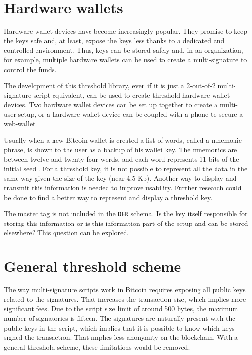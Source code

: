 \section{Hardware wallets}

Hardware wallet devices have become increasingly popular. They promise to keep
the keys safe and, at least, expose the keys less
thanks to a dedicated and controlled environment. Thus, keys can be stored
safely and, in an organization, for example, multiple hardware wallets can be
used to create a multi-signature to control the funds.

The development of this threshold library, even if it is just a 2-out-of-2
multi-signature script equivalent, can be used to create threshold hardware
wallet devices. Two hardware wallet devices can be set up together to create a
multi-user setup, or a hardware wallet device can be coupled with a phone to
secure a web-wallet.

Usually when a new Bitcoin wallet is created a list of words, called a mnemonic phrase,
is shown to the user as a backup of his wallet key. The mnemonics are between
twelve and twenty four words, and each word represents 11 bits of the initial seed
\cite{Mnemonic}. For a threshold key, it is not possible to represent all the
data in the same way given the size of the key (near 4.5 Kb). Another way to
display and transmit this information is needed to improve usability. Further
research could be done to find a better way to represent and display a threshold
key.

The master tag is not included in the \texttt{DER} schema. Is the key itself
responsible for storing this information or is this information part of the
setup and can be stored elsewhere? This question can be explored.

\section{General threshold scheme}

The way multi-signature scripts work in Bitcoin requires exposing all
public keys related to the signatures. That increases the transaction size,
which implies more significant fees. Due to the script size limit of around 500 bytes,
the maximum number of signatories is fifteen. The signatures are
naturally present with the public keys in the script, which implies that it is
possible to know which keys signed the transaction. That implies less anonymity
on the blockchain. With a general threshold scheme, these limitations would be
removed.

